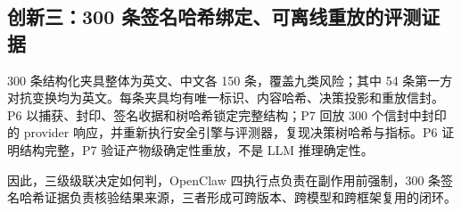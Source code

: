 \subsection{创新三：300 条签名哈希绑定、可离线重放的评测证据}

300 条结构化夹具整体为英文、中文各 150 条，覆盖九类风险；其中 54 条第一方对抗变换均为英文。每条夹具均有唯一标识、内容哈希、决策投影和重放信封。P6 以捕获、封印、签名收据和树哈希锁定完整结构；P7 回放 300 个信封中封印的 provider 响应，并重新执行安全引擎与评测器，复现决策树哈希与指标。P6 证明结构完整，P7 验证产物级确定性重放，不是 LLM 推理确定性。

因此，三级级联决定如何判，OpenClaw 四执行点负责在副作用前强制，300 条签名哈希证据负责核验结果来源，三者形成可跨版本、跨模型和跨框架复用的闭环。
